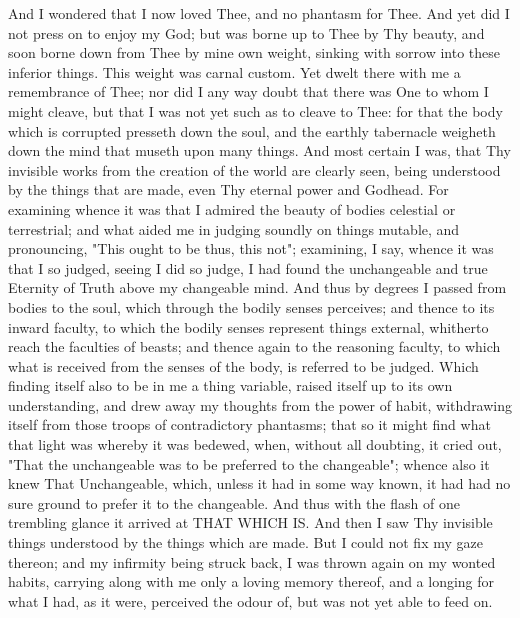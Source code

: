 \documentclass[b5paper,openright,12pt,twoside]{book}
\begin{document}
And I wondered that I now loved Thee, and no phantasm for Thee. And
yet did I not press on to enjoy my God; but was borne up to Thee by Thy
beauty, and soon borne down from Thee by mine own weight, sinking with
sorrow into these inferior things. This weight was carnal custom. Yet
dwelt there with me a remembrance of Thee; nor did I any way doubt that
there was One to whom I might cleave, but that I was not yet such as to
cleave to Thee: for that the body which is corrupted presseth down the
soul, and the earthly tabernacle weigheth down the mind that museth upon
many things. And most certain I was, that Thy invisible works from the
creation of the world are clearly seen, being understood by the things
that are made, even Thy eternal power and Godhead. For examining whence
it was that I admired the beauty of bodies celestial or terrestrial;
and what aided me in judging soundly on things mutable, and pronouncing,
"This ought to be thus, this not"; examining, I say, whence it was that
I so judged, seeing I did so judge, I had found the unchangeable and
true Eternity of Truth above my changeable mind. And thus by degrees
I passed from bodies to the soul, which through the bodily senses
perceives; and thence to its inward faculty, to which the bodily senses
represent things external, whitherto reach the faculties of beasts; and
thence again to the reasoning faculty, to which what is received from
the senses of the body, is referred to be judged. Which finding
itself also to be in me a thing variable, raised itself up to its
own understanding, and drew away my thoughts from the power of habit,
withdrawing itself from those troops of contradictory phantasms; that so
it might find what that light was whereby it was bedewed, when, without
all doubting, it cried out, "That the unchangeable was to be preferred
to the changeable"; whence also it knew That Unchangeable, which, unless
it had in some way known, it had had no sure ground to prefer it to the
changeable. And thus with the flash of one trembling glance it arrived
at THAT WHICH IS. And then I saw Thy invisible things understood by
the things which are made. But I could not fix my gaze thereon; and my
infirmity being struck back, I was thrown again on my wonted habits,
carrying along with me only a loving memory thereof, and a longing for
what I had, as it were, perceived the odour of, but was not yet able to
feed on.
\end{document}
